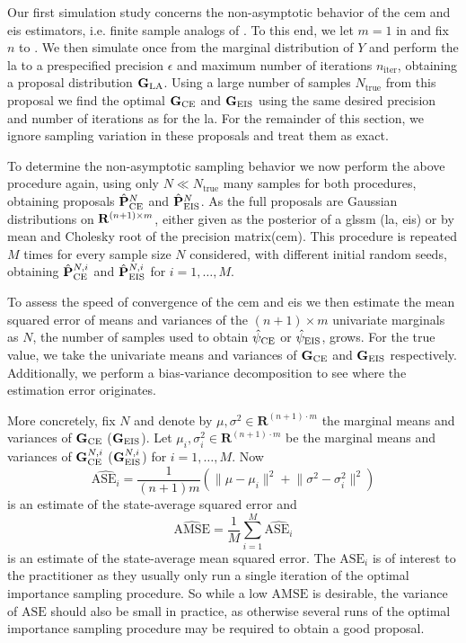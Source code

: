 
Our first simulation study concerns the non-asymptotic behavior of the \gls{cem} and \gls{eis} estimators, i.e. finite sample analogs of . To this end,
we let $m = 1$ in  and fix $n$ to . 
We then simulate once from the marginal distribution of $Y$ and perform the \gls{la} to a prespecified precision $\epsilon$ and maximum number of iterations $n_{\text{iter}}$, obtaining a proposal distribution $\mathbf G_{{\text{LA}}}$. Using a large number of samples $N_{\text{true}}$ from this proposal we find the optimal $\mathbf G_{{\text{CE}}}$ and $\mathbf G_{{\text{EIS}}}$ using the same desired precision and number of iterations as for the \gls{la}. For the remainder of this section, we ignore sampling variation in these proposals and treat them as exact. 

To determine the non-asymptotic sampling behavior we now perform the above procedure again, using only $N \ll N_{\text{true}}$ many samples for both procedures, obtaining proposals $\hat{\mathbf P}^{N}_{{\text{CE}}}$ and $\hat {\mathbf P}^{N}_{{\text{EIS}}}$. As the full proposals are Gaussian distributions on $\mathbf R^{(n+1)\times m}$, either given as the posterior of a \gls{glssm} (\gls{la}, \gls{eis}) or by mean and Cholesky root of the precision matrix(\gls{cem}). 
This procedure is repeated $M$ times for every sample size $N$ considered, with different initial random seeds, obtaining $\hat{\mathbf P}^{N,i}_{{\text{CE}}}$ and $\hat {\mathbf P}^{N,i}_{{\text{EIS}}}$ for $i = 1, \dots, M$.

To assess the speed of convergence of the \gls{cem} and \gls{eis} we then estimate the mean squared error of means and variances of the $(n+1) \times m$ univariate marginals as $N$, the number of samples used to obtain ${\hat\psi_{\text{CE}}}$ or ${\hat\psi_{\text{EIS}}}$, grows. For the true value, we take the univariate means and variances of $\mathbf G_{{\text{CE}}}$ and $\mathbf G_{{\text{EIS}}}$ respectively. Additionally, we perform a bias-variance decomposition to see where the estimation error originates. 

More concretely, fix $N$ and denote by $\mu, \sigma^{2} \in \mathbf R^{(n + 1) \cdot m}$ the marginal means and variances of $\mathbf G_{{\text{CE}}}$ ($\mathbf G_{{\text{EIS}}}$). 
Let $\mu_{i}, \sigma^{2}_{i}\in\mathbf R^{(n + 1) \cdot m}$ be the marginal means and variances of $\mathbf G^{N,i}_{{\text{CE}}}$ ($\mathbf G^{N,i}_{{\text{EIS}}}$) for $i = 1,\dots, M$. 
Now 
$$
\widehat{\text{ASE}_{i}} = \frac{1}{(n +1)m} \left( \lVert \mu - \mu_{i}\rVert^{2} + \lVert \sigma^{2} - \sigma^{2}_{i}\rVert^{2} \right)
$$
is an estimate of the state-average squared error and 
$$
\widehat{\text{AMSE}} = \frac{1}{M} \sum_{i = 1}^{M} \widehat{\text{ASE}_{i}}
$$
is an estimate of the state-average mean squared error. 
The $\text{ASE}_{i}$ is of interest to the practitioner as they usually only run a single iteration of the optimal importance sampling procedure. So while a low $\text{AMSE}$ is desirable, the variance of $\text{ASE}$ should also be small in practice, as otherwise several runs of the optimal importance sampling procedure may be required to obtain a good proposal.

